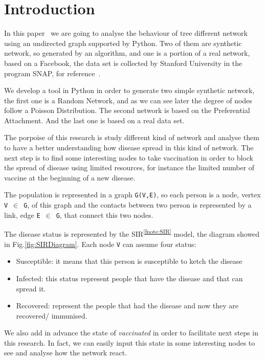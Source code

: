 
\section{Introduction}
    In this paper~\cite{thisPaper} we are going to analyse the behaviour of tree different network using an undirected graph supported by Python.
    Two of them are synthetic network, so generated by an algorithm, and one is a portion of a real network, based on a Facebook, the data set is collected by Stanford University in the program SNAP, for reference~\cite{McAuley:2012:LDS:2999134.2999195}.
  
    We develop a tool in Python in order to generate two simple synthetic network, the first one is a Random Network, and as we can see later the degree of nodes follow a Poisson Distribution.
    The second network is based on the Preferential Attachment.
    And the last one is based on a real data set.
  
    The porpoise of this research is study different kind of network and analyse them to have a better understanding how disease spread in this kind of network.
    The next step is to find some interesting nodes to take vaccination in order to block the spread of disease using limited resources, for instance the limited number of vaccine at the beginning of a new disease.
  
    The population is represented in a graph \verb|G(V,E)|, so each person is a node, vertex \verb|V|~$\in$~\verb|G|, of this graph and the contacts between two person is represented by a link, edge \verb|E|~$\in$~\verb|G|, that connect this two nodes.
  
    The disease status is represented by the SIR\textsuperscript{\ref{fnote:SIR}} model, the diagram showed in Fig.\ref{fig:SIRDiagram}.
    Each node \verb|V| can assume four status:
    \begin{itemize}
      \item Susceptible: it means that this person is susceptible to ketch the disease
      \item Infected: this status represent people that have the disease and that can spread it.
      \item Recovered: represent the people that had the disease and now they are recovered/ immunised.
    \end{itemize}

    We also add in advance the state of \textit{vaccinated} in order to facilitate next steps in this research.
    In fact, we can easily input this state in some interesting nodes to see and analyse how the network react.

